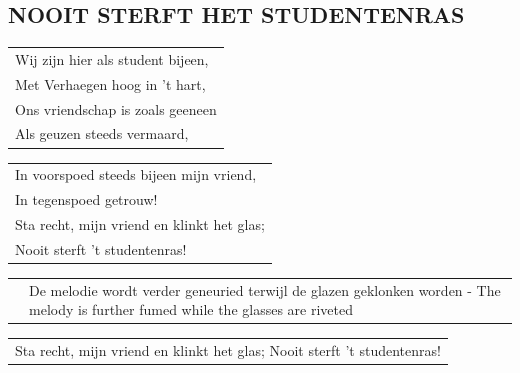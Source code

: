 \documentclass{article}
\begin{document}
\subsection*{NOOIT STERFT HET STUDENTENRAS}
\begin{flushleft}
\begin{tabularx}{0.8\textwidth} {
   >{\raggedright\arraybackslash}X}
   Wij zijn hier als student bijeen,\\
Met Verhaegen hoog in ’t hart,\\
Ons vriendschap is zoals geeneen\\
Als geuzen steeds vermaard,\\
\end{tabularx}
\end{flushleft}\begin{flushleft}
\begin{tabularx}{0.8\textwidth} {
   >{\raggedright\arraybackslash}X}
In voorspoed steeds bijeen mijn vriend,\\
In tegenspoed getrouw!\\
Sta recht, mijn vriend en klinkt het glas;\\
Nooit sterft ’t studentenras!\\
\end{tabularx}
\end{flushleft}\begin{flushleft}
\begin{tabularx}{0.8\textwidth} {
   c >{\raggedright\arraybackslash}X}
\hspace{5mm} & {\small De melodie wordt verder geneuried terwijl de glazen geklonken worden - The melody is further fumed while the glasses are riveted}\\
\end{tabularx}
\end{flushleft}\begin{flushleft}
\begin{tabularx}{0.8\textwidth} {
   >{\raggedright\arraybackslash}X}Sta recht, mijn vriend en klinkt het glas;
Nooit sterft ’t studentenras!\\
\end{tabularx}
\end{flushleft}
\end{document}
